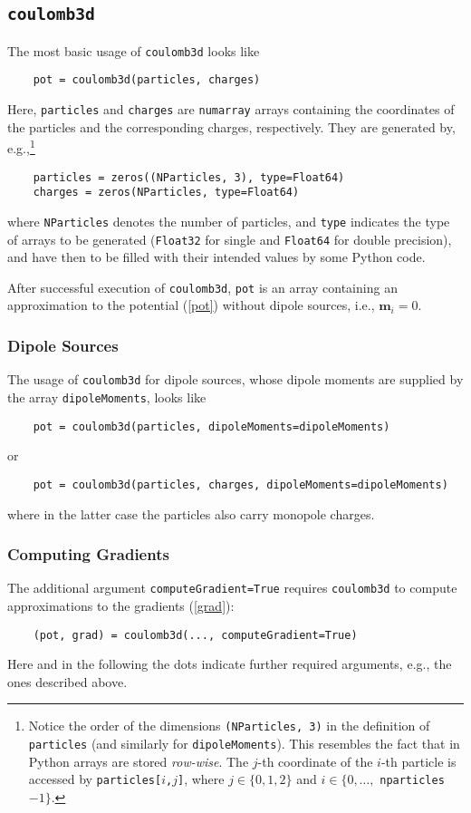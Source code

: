 \subsection{{\tt coulomb3d}}\label{python_coulomb3d}
The most basic usage of \verb|coulomb3d| looks like
\begin{verbatim}
    pot = coulomb3d(particles, charges)
\end{verbatim}
Here,  {\tt particles} and {\tt charges} are {\tt numarray} arrays containing 
the coordinates of the particles and the corresponding charges, respectively.
They are generated by, e.g.,\footnote{Notice the order of the dimensions
{\tt(NParticles, 3)} in the definition of {\tt particles} (and similarly for
{\tt dipoleMoments}).
This resembles the fact that in
Python %
arrays are stored {\em row-wise}.
The $j$-th coordinate of the $i$-th particle is accessed by
{\tt particles[}$i${\tt ,}$j${\tt ]}, 
where $j\in\{0,1,2\}$ and $i\in\{0,\dots, $ {\tt nparticles}$-1\}$.
}
\begin{verbatim}
    particles = zeros((NParticles, 3), type=Float64)
    charges = zeros(NParticles, type=Float64)
\end{verbatim}
where \verb|NParticles| denotes the number of particles, and \verb|type|
indicates the type of arrays to be generated (\verb|Float32| for single
and \verb|Float64| for double precision), and have then to be filled with
their intended values by some Python code.  

After successful execution of \verb|coulomb3d|, \verb|pot| is 
an array containing an approximation to the potential (\ref{pot}) without
dipole sources, i.e., $\mathbf{m}_i=0$.

\subsubsection*{Dipole Sources}
The usage of \verb|coulomb3d| for 
dipole sources, whose dipole moments are supplied by the array
\verb|dipoleMoments|, 
looks like
\begin{verbatim}
    pot = coulomb3d(particles, dipoleMoments=dipoleMoments)
\end{verbatim}
or
\begin{verbatim}
    pot = coulomb3d(particles, charges, dipoleMoments=dipoleMoments)
\end{verbatim}
where in the latter case the particles also carry monopole charges.
\subsubsection*{Computing Gradients}
The additional argument \verb|computeGradient=True| requires
\verb|coulomb3d| to compute  approximations to the gradients
(\ref{grad}):
\begin{verbatim}
    (pot, grad) = coulomb3d(..., computeGradient=True)
\end{verbatim}
Here and in the following the dots indicate further required 
arguments, e.g., the ones described above.
